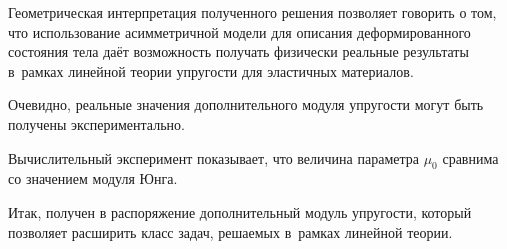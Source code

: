 Геометрическая интерпретация полученного решения позволяет говорить о том, что использование асимметричной модели для описания деформированного состояния тела даёт возможность получать физически реальные результаты в~рамках линейной теории упругости для эластичных материалов.  

Очевидно, реальные значения дополнительного модуля упругости могут быть получены экспериментально. 

Вычислительный эксперимент показывает, что величина параметра $\mu_{0}$ сравнима со значением модуля Юнга.



Итак, получен в распоряжение дополнительный модуль упругости, который позволяет расширить класс задач, решаемых в~рамках линейной теории.





